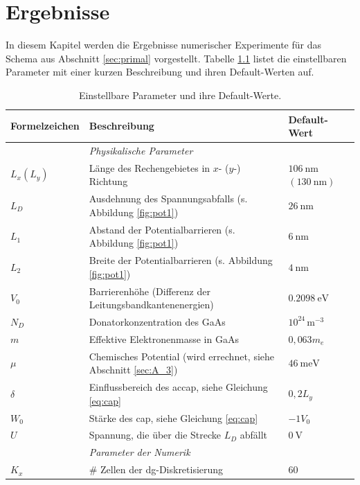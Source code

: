 \chapter{Ergebnisse}
In diesem Kapitel werden die Ergebnisse numerischer Experimente für das Schema aus Abschnitt \ref{sec:primal} vorgestellt. Tabelle \ref{tab:parameter} listet die einstellbaren Parameter mit einer kurzen Beschreibung und ihren Default-Werten auf.
\begin{table}
  \centering
  \caption{Einstellbare Parameter und ihre Default-Werte.}
  \label{tab:parameter}
  \scriptsize
  \begin{tabular}{
    l
    l
    l
  }
    \toprule
    {Formelzeichen} & Beschreibung & Default-Wert \\
    \midrule
       & \emph{Physikalische Parameter} & \\
    $L_x (L_y)$ &Länge des Rechengebietes in $x$- ($y$-) Richtung & $\SI{106}{\nano\meter}$ $(\SI{130}{\nano\meter})$ \\
    $L_D$ & Ausdehnung des Spannungsabfalls (s. Abbildung \ref{fig:pot1}) & $\SI{26}{\nano\meter}$\\
    $L_1$ & Abstand der Potentialbarrieren (s. Abbildung \ref{fig:pot1}) &$\SI{6}{\nano\meter}$ \\
    $L_2$ & Breite der Potentialbarrieren  (s. Abbildung \ref{fig:pot1}) &$\SI{4}{\nano\meter}$ \\
    $V_0$ & Barrierenhöhe (Differenz der Leitungsbandkantenenergien) &$\SI{0.2098}{\electronvolt}$ \\
    $N_D$ & Donatorkonzentration des GaAs & $10^{24}\,\text{m}^{-3}$ \\
    $m$ & Effektive Elektronenmasse in GaAs & $0,063 m_e$ \\
    $\mu$   & Chemisches Potential (wird errechnet, siehe Abschnitt \ref{sec:A_3}) & $\SI{46}{\milli\electronvolt}$ \\
    $\delta$ & Einflussbereich des ac{cap}, siehe Gleichung \eqref{eq:cap} & $0,2 L_y$\\
    $W_0$ & Stärke des \ac{cap}, siehe Gleichung \eqref{eq:cap} &$-1V_0$ \\
    $U$   &Spannung, die über die Strecke $L_D$ abfällt & $\SI{0}{\volt}$ \\
    \midrule
     & \emph{Parameter der Numerik} & \\
    $K_x$ & \# Zellen der \ac{dg}-Diskretisierung & 60 \\

\end{tabular}
\end{table}
